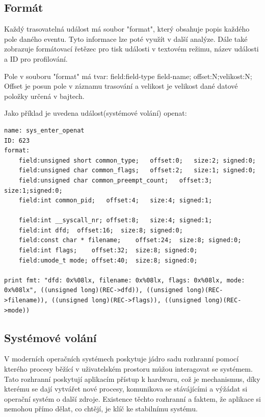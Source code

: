 \subsection*{Formát}
Každý trasovatelná událost má soubor "format", který obsahuje popis každého pole daného eventu. Tyto informace lze poté využít v další
analýze. Dále také zobrazuje formátovací řetězec pro tisk události v textovém režimu, název události a ID pro profilování.

Pole v souboru "format" má tvar:
field:field-type field-name; offset:N;velikost:N;
Offset je posun pole v záznamu trasování a velikost je velikost dané datové položky určená v bajtech.

Jako příklad je uvedena událost(systémové volání) openat:

\begin{verbatim}
name: sys_enter_openat
ID: 623
format:
	field:unsigned short common_type;	offset:0;	size:2;	signed:0;
	field:unsigned char common_flags;	offset:2;	size:1;	signed:0;
	field:unsigned char common_preempt_count;	offset:3;	size:1;signed:0;
	field:int common_pid;	offset:4;	size:4;	signed:1;

	field:int __syscall_nr;	offset:8;	size:4;	signed:1;
	field:int dfd;	offset:16;	size:8;	signed:0;
	field:const char * filename;	offset:24;	size:8;	signed:0;
	field:int flags;	offset:32;	size:8;	signed:0;
	field:umode_t mode;	offset:40;	size:8;	signed:0;

print fmt: "dfd: 0x%08lx, filename: 0x%08lx, flags: 0x%08lx, mode: 0x%08lx", ((unsigned long)(REC->dfd)), ((unsigned long)(REC->filename)), ((unsigned long)(REC->flags)), ((unsigned long)(REC->mode))
\end{verbatim}

\subsection{Systémové volání}

V moderních operačních systémech poskytuje jádro sadu rozhranní pomocí kterého procesy běžící v uživatelském prostoru můžou interagovat
se systémem. Tato rozhranní poskytují aplikacím přístup k hardwaru, což je mechanismus, díky kterému se dají vytvářet nové procesy,
komunikova se stávájícími a výžádat si operační systém o další zdroje. Existence těchto rozhranní a faktem, že aplikace si nemohou přímo
dělat, co chtějí, je klíč ke stabilnímu systému.

